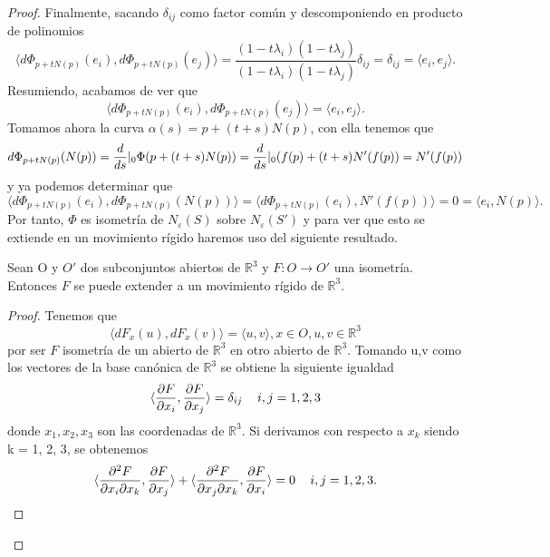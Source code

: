 \begin{proof}
	Finalmente, sacando $\delta_{ij}$ como factor común y descomponiendo en producto de polinomios
	${ }$\\
	\[
	\langle d\Phi_{p + tN(p)}(e_i), d\Phi_{p + tN(p)}(e_j) \rangle = \frac{(1 - t\lambda_i)(1 - t\lambda_j)}{(1 - t\lambda_i)(1 - t\lambda_j)}\delta_{ij} = \delta_{ij} = \langle e_i, e_j \rangle.
	\]
	${ }$\\
	
	Resumiendo, acabamos de ver que
	${ }$\\
	\[
	\langle d\Phi_{p + tN(p)}(e_i), d\Phi_{p + tN(p)}(e_j) \rangle = \langle e_i, e_j\rangle.
	\]
	${ }$\\
	
	Tomamos ahora la curva $\alpha(s) = p + (t + s)N(p)$, con ella tenemos que
	${ }$\\
	\[
	d\Phi_{p + tN(p)}(N(p)) = \frac{d}{ds}\arrowvert_0\Phi(p + (t + s)N(p)) = \frac{d}{ds}\arrowvert_0(f(p) + (t + s)N'(f(p)) = N'(f(p))
	\]
	${ }$\\
	y ya podemos determinar que
	${ }$\\
	\[
	 \langle d\Phi_{p + tN(p)}(e_i), d\Phi_{p + tN(p)}(N(p)) \rangle = \langle d\Phi_{p + tN(p)}(e_i), N'(f(p)) \rangle = 0 = \langle e_i, N(p) \rangle.
	\]
	${ }$\\
	
	Por tanto, $\Phi$ es isometría de $N_\varepsilon(S)$ sobre $N_\varepsilon(S')$ y para ver que esto se extiende en un movimiento rígido haremos uso del siguiente resultado.
	${ }$\\
	
	\begin{proposicion}
		Sean O y $O'$ dos subconjuntos abiertos de $\mathbb{R}^3$ y $F : O \to O'$ una isometría. Entonces $F$ se puede extender a un movimiento rígido de $\mathbb{R}^3$.
	\end{proposicion}
	
	\begin{proof}
		Tenemos que
		${ }$\\
		\[
		\langle dF_x(u), dF_x(v) \rangle = \langle u, v \rangle , x \in O, u,v \in \mathbb{R}^3
		\]
		${ }$\\
		por ser $F$ isometría de un abierto de $\mathbb{R}^3$ en otro abierto de $\mathbb{R}^3$. Tomando u,v como los vectores de la base canónica de $\mathbb{R}^3$ se obtiene la siguiente igualdad
		${ }$\\
		\[
		\langle \frac{\partial F}{\partial x_i}, \frac{\partial F}{\partial x_j} \rangle = \delta_{ij} \thinspace \thinspace \thinspace \thinspace \thinspace \thinspace \thinspace i,j = 1,2,3
		\]
		${ }$\\
 		donde $x_1, x_2, x_3$ son las coordenadas de $\mathbb{R}^3$. Si derivamos con respecto a $x_k$ siendo k = 1, 2, 3, se obtenemos
 		${ }$\\
		\[
		\langle\frac{\partial^2 F}{\partial x_i \partial x_k}, \frac{\partial F}{\partial x_j} \rangle + \langle \frac{\partial^2 F}{\partial x_j \partial x_k}, \frac{\partial F}{\partial x_i} \rangle = 0 \thinspace \thinspace \thinspace \thinspace \thinspace \thinspace \thinspace i,j = 1,2,3.
		\]
		${ }$\\
		

\end{proof}
\end{proof}
